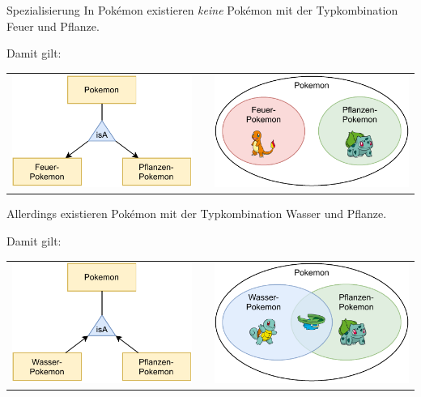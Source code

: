 \begin{example}{Spezialisierung}
    In Pokémon existieren \emph{keine} Pokémon mit der Typkombination Feuer und Pflanze.

    Damit gilt:
    \begin{center}
        \begin{tabular}{ccc}
            \includegraphics[width=0.4\linewidth]{includes/figures/example_specialization_er_diagram_disjunct.pdf}
             & \hspace{2em} &
            \includegraphics[width=0.4\linewidth]{includes/figures/example_specialization_venn_diagram_disjunct.pdf}
        \end{tabular}
    \end{center}

    Allerdings existieren Pokémon mit der Typkombination Wasser und Pflanze.

    Damit gilt:
    \begin{center}
        \begin{tabular}{ccc}
            \includegraphics[width=0.4\linewidth]{includes/figures/example_specialization_er_diagram_not_disjunct.pdf}
             & \hspace{2em} &
            \includegraphics[width=0.4\linewidth]{includes/figures/example_specialization_venn_diagram_not_disjunct.pdf}
        \end{tabular}
    \end{center}
\end{example}

